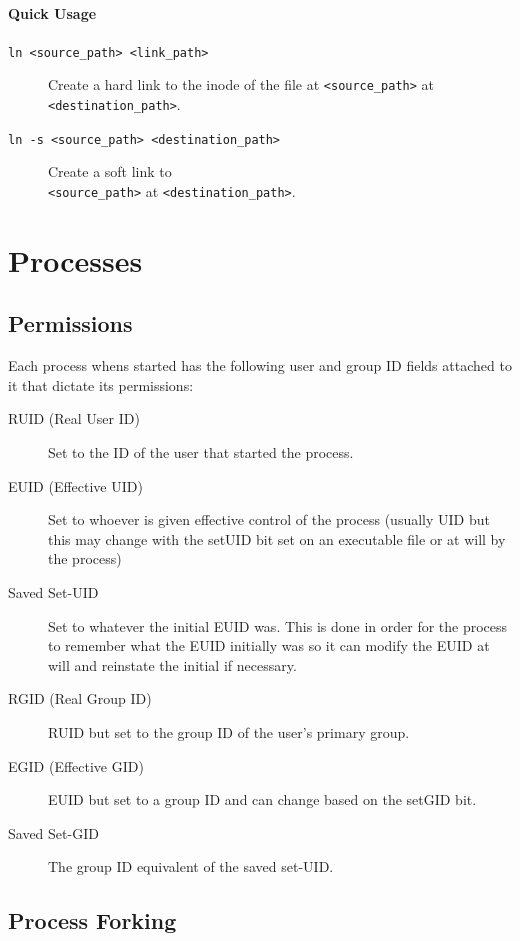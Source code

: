 \documentclass{article}
\newcommand{\code}[1]{\texttt{#1}}
\begin{document}
\paragraph{Quick Usage}

\begin{description}
    \item[\code{ln <source\_path> <link\_path>}] Create a hard link to the inode of the file at \code{<source\_path>} at \code{<destination\_path>}.
    \item[\code{ln -s <source\_path> <destination\_path>}] Create a soft link to \\\code{<source\_path>} at \code{<destination\_path>}.
\end{description}

\section{Processes}

\subsection{Permissions}

Each process whens started has the following user and group ID fields attached to it that dictate its permissions:

\begin{description}
    \item[RUID (Real User ID)] Set to the ID of the user that started the process.
    \item[EUID (Effective UID)] Set to whoever is given effective control of the process (usually UID but this may change with the setUID bit set on an executable file or at will by the process)
    \item[Saved Set-UID] Set to whatever the initial EUID was. This is done in order for the process to remember what the EUID initially was so it can modify the EUID at will and reinstate the initial if necessary.
    \item[RGID (Real Group ID)] RUID but set to the group ID of the user's primary group.
    \item[EGID (Effective GID)] EUID but set to a group ID and can change based on the setGID bit.
    \item[Saved Set-GID] The group ID equivalent of the saved set-UID.
\end{description}

\subsection{Process Forking}
\end{document}
